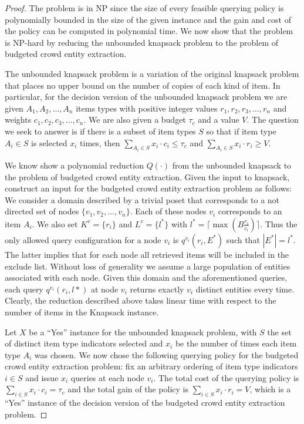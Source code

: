 \documentclass[conference]{IEEEtran}
\begin{document}
\begin{proof}
The problem is in NP since the size of every feasible querying policy is polynomially bounded in the size of the given instance and the gain and cost of the policy can be computed in polynomial time. We now show that the problem is NP-hard by reducing the unbounded knapsack problem to the problem of budgeted crowd entity extraction. 

The unbounded knapsack problem is a variation of the original knapsack problem that places no upper bound on the number of copies of each kind of item.  In particular, for the decision version of the unbounded knapsack problem we are given $A_1, A_2, \dots, A_n$ items types with positive integer values $r_1, r_2, r_3, \dots, r_n$ and weights $c_1, c_2, c_3, \dots, c_n$. We are also given a budget $\tau_c$ and a value $V$.  The question we seek to answer is if there is a subset of item types $S$ so that if item type $A_i \in S$ is selected $x_i$ times, then $\sum_{A_i \in S} x_i \cdot c_i \leq \tau_c$ and $\sum_{A_i \in S} x_i \cdot r_i \geq V$.

We know show a polynomial reduction $Q(\cdot)$ from the unbounded knapsack to the problem of budgeted crowd entity extraction.  Given the input to knapsack, construct an input for the budgeted crowd entity extraction problem as follows: We consider a domain described by a trivial poset that corresponds to a not directed set of nodes $\{v_1, v_2, \dots, v_n\}$. Each of these nodes $v_i$ corresponds to an item $A_i$. We also set $K^v = \{r_i\}$ and $L^v = \{l^*\}$ with $l^* = \lceil \max (B\frac{r_i}{c_i}) \rceil$. Thus the only allowed query configuration for a node $v_i$ is $q^{v_i}(r_i,E^*)$ such that $|E^*| = l^*$. The latter implies that for each node all retrieved items will be included in the exclude list. Without loss of generality we assume a large population of entities associated with each node. Given this domain and the aforementioned queries, each query $q^{v_i}(r_i,l*)$ at node $v_i$ returns exactly $v_i$ distinct entities every time. Clearly, the reduction described above takes linear time with respect to the number of items in the Knapsack instance. 

Let $X$ be a ``Yes'' instance for the unbounded knapsack problem, with $S$ the set of distinct item type indicators selected and $x_i$ be the number of times each item type $A_i$ was chosen. We now chose the following querying policy for the budgeted crowd entity extraction problem: fix an arbitrary ordering of item type indicators $i \in S$ and issue $x_i$ queries at each node $v_i$. The total cost of the querying policy is $\sum_{i \in S} x_i \cdot c_i = \tau_c$ and the total gain of the policy is $\sum_{i \in S} x_i \cdot r_i = V$, which is a ``Yes'' instance of the decision version of the budgeted crowd entity extraction problem. 


\end{proof}
\end{document}
